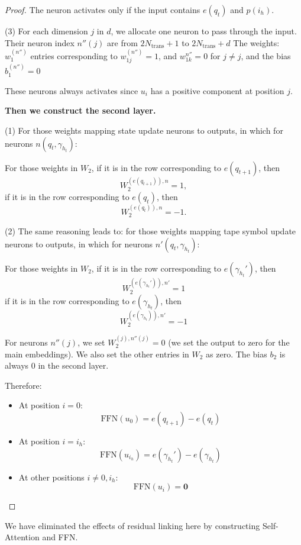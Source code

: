 {\begin{proof}
The neuron activates only if the input contains \( e(q_t) \) and \( p(i_h) \).

(3) For each dimension \( j \) in \( d \), we allocate one neuron to pass through the input. Their neuron index \( n''(j) \) are from \( 2N_{\text{trans}} + 1 \) to \( 2N_{\text{trans}} + d \)
The weights: \( w_1^{(n'')} \) entries corresponding to \( {w_{1j}^{(n'')}} = 1 \), and \( {w_{1k}^{n''}} = 0 \) for \(j \neq j\),
and the bias \( b_1^{(n'')} = 0 \)


These neurons always activates since \( u_i \) has a positive component at position \( j \).

\textbf{Then we construct the second layer.}

(1) For those weights mapping state update neurons to outputs, in which for neurons \( n(q_t, \gamma_{h_t}) \):

For those weights in \( W_2 \),
  if it is in the row corresponding to \( e(q_{t+1}) \), then
    \[
    W_2^{(e(q_{t+1})), n} = 1,
    \]
if it is in the row corresponding to \( e(q_t) \), then
    \[
    W_2^{(e(q_t)), n} = -1.
    \]
    
(2) The same reasoning leads to:
for those weights mapping tape symbol update neurons to outputs, in which for neurons \( n'(q_t, \gamma_{h_t}) \):

For those weights in \( W_2 \),
  if it is in the row corresponding to \( e(\gamma_{h_t}') \), then
    \[
    W_2^{(e(\gamma_{h_t}')), n'} = 1
    \]
if it is in the row corresponding to \( e(\gamma_{h_t}) \), then
    \[
    W_2^{(e(\gamma_{h_t})), n'} = -1
    \]
%

For neurons \( n''(j) \), we set \( W_2^{(j), n''(j)} = 0 \) (we set the output to zero for the main embeddings). 
We also set the other entries in \( W_2 \) as zero.
The bias \(b_2\) is always 0 in the second layer.

Therefore: 
\begin{itemize}
    \item At position \( i = 0 \): \[ \text{FFN}(u_0) = e(q_{t+1}) - e(q_t) \]
    \item At position \( i = i_h \): \[ \text{FFN}(u_{i_h}) = e(\gamma_{h_t}') - e(\gamma_{h_t}) \]
 \item At other positions \( i \neq 0, i_h \): \[ \text{FFN}(u_i) = \mathbf{0} \]
\end{itemize}



\end{proof}

We have eliminated the effects of residual linking here by constructing Self-Attention and FFN.

}

